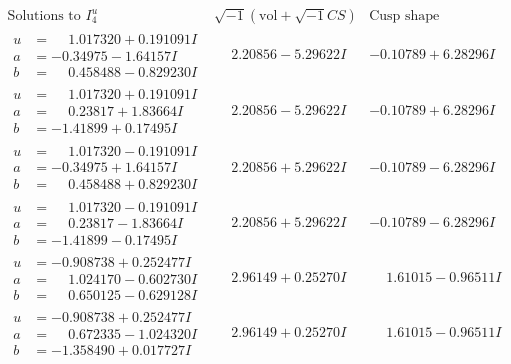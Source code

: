 \documentclass[1p]{elsarticle_modified}
\theoremstyle{definition}
\newcommand{\I}{\sqrt{-1}}
\begin{document}
$$\begin{array}{c|c|c}  
\text{Solutions to }I^u_{4}& \I (\text{vol} + \sqrt{-1}CS) & \text{Cusp shape}\\
 \hline 
\begin{aligned}
u &= \phantom{-}1.017320 + 0.191091 I \\
a &= -0.34975 - 1.64157 I \\
b &= \phantom{-}0.458488 - 0.829230 I\end{aligned}
 & \phantom{-}2.20856 - 5.29622 I & -0.10789 + 6.28296 I \\ \hline\begin{aligned}
u &= \phantom{-}1.017320 + 0.191091 I \\
a &= \phantom{-}0.23817 + 1.83664 I \\
b &= -1.41899 + 0.17495 I\end{aligned}
 & \phantom{-}2.20856 - 5.29622 I & -0.10789 + 6.28296 I \\ \hline\begin{aligned}
u &= \phantom{-}1.017320 - 0.191091 I \\
a &= -0.34975 + 1.64157 I \\
b &= \phantom{-}0.458488 + 0.829230 I\end{aligned}
 & \phantom{-}2.20856 + 5.29622 I & -0.10789 - 6.28296 I \\ \hline\begin{aligned}
u &= \phantom{-}1.017320 - 0.191091 I \\
a &= \phantom{-}0.23817 - 1.83664 I \\
b &= -1.41899 - 0.17495 I\end{aligned}
 & \phantom{-}2.20856 + 5.29622 I & -0.10789 - 6.28296 I \\ \hline\begin{aligned}
u &= -0.908738 + 0.252477 I \\
a &= \phantom{-}1.024170 - 0.602730 I \\
b &= \phantom{-}0.650125 - 0.629128 I\end{aligned}
 & \phantom{-}2.96149 + 0.25270 I & \phantom{-}1.61015 - 0.96511 I \\ \hline\begin{aligned}
u &= -0.908738 + 0.252477 I \\
a &= \phantom{-}0.672335 - 1.024320 I \\
b &= -1.358490 + 0.017727 I\end{aligned}
 & \phantom{-}2.96149 + 0.25270 I & \phantom{-}1.61015 - 0.96511 I \\ \hline\begin{aligned}

\end{aligned}
\end{array}$$
\end{document}
